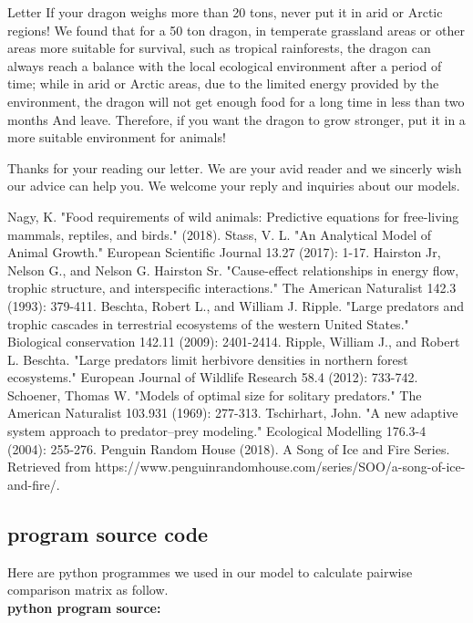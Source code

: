 \documentclass{mcmthesis}
\begin{document}
\begin{letter}{Letter}
If your dragon weighs more than 20 tons, never put it in arid or Arctic regions! We found that for a 50 ton dragon, in temperate grassland areas or other areas more suitable for survival, such as tropical rainforests, the dragon can always reach a balance with the local ecological environment after a period of time; while in arid or Arctic areas, due to the limited energy provided by the environment, the dragon will not get enough food for a long time in less than two months And leave.
Therefore, if you want the dragon to grow stronger, put it in a more suitable environment for animals!

Thanks for your reading our letter. We are your avid reader and we sincerly wish our advice can help you. We welcome your reply
and inquiries about our models.\\

\end{letter}

\newpage

\begin{thebibliography}{99}
 Nagy, K. "Food requirements of wild animals: Predictive equations for free-living mammals, reptiles, and birds." (2018).
 Stass, V. L. "An Analytical Model of Animal Growth." European Scientific Journal 13.27 (2017): 1-17.
 Hairston Jr, Nelson G., and Nelson G. Hairston Sr. "Cause-effect relationships in energy flow, trophic structure, and interspecific interactions." The American Naturalist 142.3 (1993): 379-411.
 Beschta, Robert L., and William J. Ripple. "Large predators and trophic cascades in terrestrial ecosystems of the western United States." Biological conservation 142.11 (2009): 2401-2414.
 Ripple, William J., and Robert L. Beschta. "Large predators limit herbivore densities in northern forest ecosystems." European Journal of Wildlife Research 58.4 (2012): 733-742.
 Schoener, Thomas W. "Models of optimal size for solitary predators." The American Naturalist 103.931 (1969): 277-313.
 Tschirhart, John. "A new adaptive system approach to predator–prey modeling." Ecological Modelling 176.3-4 (2004): 255-276.
 Penguin Random House (2018). A Song of Ice and Fire Series. Retrieved from https://www.penguinrandomhouse.com/series/SOO/a-song-of-ice-and-fire/.
\end{thebibliography}

\newpage
\begin{appendices}
\section{program source code}
Here are python programmes we used in our model to calculate pairwise comparison matrix as follow.\\
\textbf{\textcolor[rgb]{0.98,0.00,0.00}{python program source:}}


\end{appendices}
\end{document}
